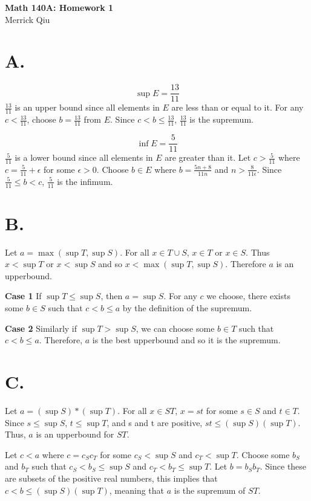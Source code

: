 \documentclass{article}
\begin{document}
\begin{center}
	\huge{\bf Math 140A: Homework 1} \\
	Merrick Qiu
\end{center}
\section*{A.}
    \[
        \sup E = \frac{13}{11}
    \]
    $\frac{13}{11}$ is an upper bound since all elements in $E$ are less than or equal to it.
    For any $c<\frac{13}{11}$, choose $b=\frac{13}{11}$ from $E$.
    Since $c < b \leq \frac{13}{11}$, $\frac{13}{11}$ is the supremum.

    \[
        \inf E = \frac{5}{11}
    \]
    $\frac{5}{11}$ is a lower bound since all elements in $E$ are greater than it.
    Let $c>\frac{5}{11}$ where $c = \frac{5}{11} + \epsilon$ for some $\epsilon > 0$.
    Choose $b \in E$ where $b = \frac{5n+8}{11n}$ and $n > \frac{8}{11\epsilon}$.
    Since $\frac{5}{11} \leq b < c$, $\frac{5}{11}$ is the infimum.   
    \newpage
\section*{B.}
    Let $a = \max(\sup T, \sup S)$.
    For all $x \in T \cup S$, $x \in T$ or $x \in S$.
    Thus $x < \sup T$ or $x < \sup S$ and so $x < \max(\sup T, \sup S)$.
    Therefore $a$ is an upperbound.

    \textbf{Case 1} If $\sup T \leq \sup S$, then $a=\sup S$.
    For any $c$ we choose, there exists some $b \in S$ such that $c < b \leq a$
    by the definition of the supremum.

    \textbf{Case 2} Similarly if $\sup T > \sup S$, we can choose some $b \in T$ such that $c < b \leq a$.
    Therefore, $a$ is the best upperbound and so it is the supremum.
    \newpage
\section*{C.}
    Let $a=(\sup S)*(\sup T)$.
    For all $x \in ST$, $x=st$ for some $s \in S$ and $t \in T$.
    Since $s \leq \sup S$, $t \leq \sup T$, and s and t are positive, 
    $st \leq (\sup S)(\sup T)$.
    Thus, $a$ is an upperbound for $ST$.

    Let $c < a$ where $c = c_Sc_T$ for some $c_S < \sup S$ and $c_T < \sup T$.
    Choose some $b_S$ and $b_T$ such that
    $c_S< b_S \leq \sup S$ and $c_T< b_T \leq \sup T$.
    Let $b = b_Sb_T$.
    Since these are subsets of the positive real numbers, this implies that 
    $c < b \leq (\sup S)(\sup T)$, meaning that $a$ is the supremum of $ST$.\\
\end{document}
